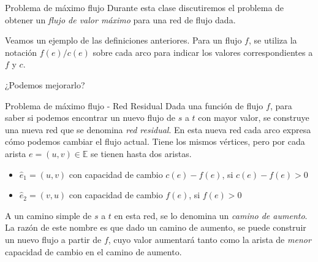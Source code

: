 \documentclass[8pt,xcolor={dvipsnames}]{beamer}
\begin{document}
\begin{frame}{Problema de m\'aximo flujo}
	Durante esta clase discutiremos el problema de obtener un \textit{flujo de valor m\'aximo} para una red de flujo dada.
	
	Veamos un ejemplo de las definiciones anteriores. Para un flujo $f$, se utiliza la notaci\'on $f(e) / c(e)$ sobre cada arco para indicar los valores correspondientes a $f$ y $c$.
	\pause
	\begin{center} 
	\end{center} 
	\pause
	
	¿Podemos mejorarlo?
\end{frame}

\begin{frame}{Problema de m\'aximo flujo - Red Residual}
	Dada una funci\'on de flujo $f$, para saber si podemos encontrar un nuevo flujo de $s$ a $t$ con mayor valor, se construye una nueva red que se denomina \textit{red residual}. En esta nueva red cada arco expresa c\'omo podemos cambiar el flujo actual. Tiene los mismos v\'ertices, pero por cada arista $e = (u,v) \in \mathbb{E}$ se tienen hasta dos aristas.
	\begin{itemize}
		\item $\hat{e}_1 = (u,v)$ con capacidad de cambio $c(e) - f(e)$, si $c(e) - f(e) > 0$
		\item $\hat{e}_2 = (v,u)$ con capacidad de cambio $f(e)$, si $f(e) > 0$
	\end{itemize}
	\pause
	A un camino simple de $s$ a $t$ en esta red, se lo denomina un \textit{camino de aumento}. La raz\'on de este nombre es que dado un camino de aumento, se puede construir un nuevo flujo a partir de $f$, cuyo valor aumentar\'a tanto como la arista de \textit{menor} capacidad de cambio en el camino de aumento.
	
\end{frame}
\end{document}
